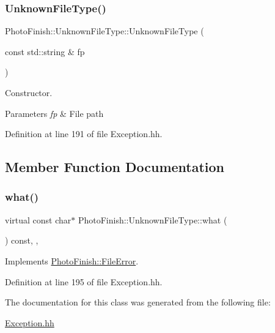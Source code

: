 \subsubsection{\texorpdfstring{Unknown\+File\+Type()}{UnknownFileType()}\hspace{0.1cm}{\footnotesize\ttfamily [2/2]}}
{\footnotesize\ttfamily Photo\+Finish\+::\+Unknown\+File\+Type\+::\+Unknown\+File\+Type (\begin{DoxyParamCaption}\item[{const std\+::string \&}]{fp }\end{DoxyParamCaption})\hspace{0.3cm}{\ttfamily [inline]}}



Constructor. 


\begin{DoxyParams}{Parameters}
{\em fp} & File path \\
\hline
\end{DoxyParams}


Definition at line 191 of file Exception.\+hh.



\subsection{Member Function Documentation}
\mbox{\label{class_photo_finish_1_1_unknown_file_type_a756a01080a750ff0c5bb6fa81e9a6b2a}} 
\subsubsection{\texorpdfstring{what()}{what()}}
{\footnotesize\ttfamily virtual const char$\ast$ Photo\+Finish\+::\+Unknown\+File\+Type\+::what (\begin{DoxyParamCaption}{ }\end{DoxyParamCaption}) const\hspace{0.3cm}{\ttfamily [inline]}, {\ttfamily [virtual]}, {\ttfamily [noexcept]}}



Implements \hyperlink{class_photo_finish_1_1_file_error_ac4da80387c770aa95858dae8aac9a81e}{Photo\+Finish\+::\+File\+Error}.



Definition at line 195 of file Exception.\+hh.



The documentation for this class was generated from the following file\+:\begin{DoxyCompactItemize}
\item 
\hyperlink{_exception_8hh}{Exception.\+hh}\end{DoxyCompactItemize}
